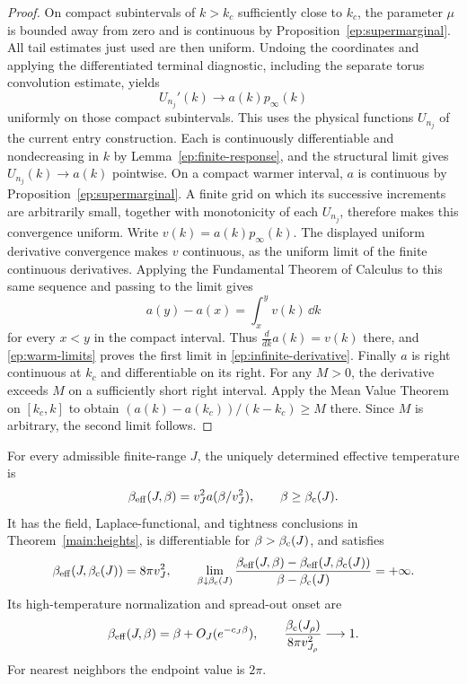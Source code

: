 \begin{proof}
On compact subintervals of $k>k_c$ sufficiently close
to $k_c$, the parameter $\mu$ is bounded away from zero
and is continuous by Proposition~\ref{ep:supermarginal}.
All tail estimates just used are then uniform.
Undoing the coordinates and applying the differentiated
terminal diagnostic, including the separate torus
convolution estimate, yields
\[
 U_{n_j}'(k)\longrightarrow a(k)p_\infty(k)
\]
uniformly on those compact subintervals.
This uses the physical functions $U_{n_j}$ of the current entry
construction.  Each is continuously differentiable and nondecreasing
in $k$ by Lemma~\ref{ep:finite-response}, and the structural limit
gives $U_{n_j}(k)\to a(k)$ pointwise.  On a compact warmer interval,
$a$ is continuous by Proposition~\ref{ep:supermarginal}.  A finite
grid on which its successive increments are arbitrarily small,
together with monotonicity of each $U_{n_j}$, therefore makes this
convergence uniform.  Write $v(k)=a(k)p_\infty(k)$.  The displayed
uniform derivative convergence makes $v$ continuous, as the uniform
limit of the finite continuous derivatives.  Applying the Fundamental
Theorem of Calculus to this same sequence and passing to the limit gives
\[
 a(y)-a(x)=\int_x^y v(k)\,\dd k
\]
for every $x<y$ in the compact interval.  Thus
$\frac{d}{dk}a(k)=v(k)$ there, and
\eqref{ep:warm-limits} proves the first limit in
\eqref{ep:infinite-derivative}.  Finally $a$ is right
continuous at $k_c$ and differentiable on its right.
For any $M>0$, the derivative exceeds $M$ on a sufficiently
short right interval.  Apply the Mean Value Theorem on
$[k_c,k]$ to obtain
$(a(k)-a(k_c))/(k-k_c)\ge M$ there.
Since $M$ is arbitrary, the second limit follows.
\end{proof}

\begin{corollary}
\label{ep:height-conclusion}
For every admissible finite-range $J$, the uniquely determined
effective temperature is
\[
 \beta_{\mathrm{eff}}(J,\beta)=v_J^2a(\beta/v_J^2),\qquad
 \beta\ge\beta_{\mathrm c}(J).
\]
It has the field, Laplace-functional, and tightness conclusions
in Theorem~\ref{main:heights}, is differentiable for $\beta>\beta_{\mathrm c}(J)$, and satisfies
\[
 \beta_{\mathrm{eff}}(J,\beta_{\mathrm c}(J))=8\pi v_J^2,\qquad
 \lim_{\beta\downarrow\beta_{\mathrm c}(J)}
 \frac{\beta_{\mathrm{eff}}(J,\beta)-\beta_{\mathrm{eff}}(J,\beta_{\mathrm c}(J))}
      {\beta-\beta_{\mathrm c}(J)}=+\infty .
\]
Its high-temperature normalization and spread-out onset are
\[
 \beta_{\mathrm{eff}}(J,\beta)=\beta+O_J(e^{-c_J\beta}),\qquad
 \frac{\beta_{\mathrm c}(J_\rho)}{8\pi v_{J_\rho}^2}\longrightarrow1 .
\]
For nearest neighbors the endpoint value is $2\pi$.
\end{corollary}

